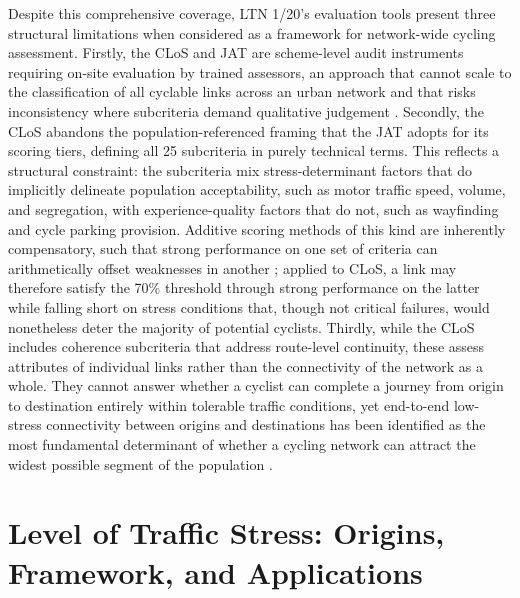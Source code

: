 Despite this comprehensive coverage, LTN 1/20's evaluation tools present three structural limitations when considered as a framework for network-wide cycling assessment. Firstly, the CLoS and JAT are scheme-level audit instruments requiring on-site evaluation by trained assessors, an approach that cannot scale to the classification of all cyclable links across an urban network and that risks inconsistency where subcriteria demand qualitative judgement \parencite{hancock2024}. Secondly, the CLoS abandons the population-referenced framing that the JAT adopts for its scoring tiers, defining all 25 subcriteria in purely technical terms. This reflects a structural constraint: the subcriteria mix stress-determinant factors that do implicitly delineate population acceptability, such as motor traffic speed, volume, and segregation, with experience-quality factors that do not, such as wayfinding and cycle parking provision. Additive scoring methods of this kind are inherently compensatory, such that strong performance on one set of criteria can arithmetically offset weaknesses in another \parencite{pais2022,wang2022}; applied to CLoS, a link may therefore satisfy the 70\% threshold through strong performance on the latter while falling short on stress conditions that, though not critical failures, would nonetheless deter the majority of potential cyclists. Thirdly, while the CLoS includes coherence subcriteria that address route-level continuity, these assess attributes of individual links rather than the connectivity of the network as a whole. They cannot answer whether a cyclist can complete a journey from origin to destination entirely within tolerable traffic conditions, yet end-to-end low-stress connectivity between origins and destinations has been identified as the most fundamental determinant of whether a cycling network can attract the widest possible segment of the population \parencite{mekuria2012a,wang2016,lowry2017}.


\section{Level of Traffic Stress: Origins, Framework, and Applications }
\label{sec:lit-lts}

